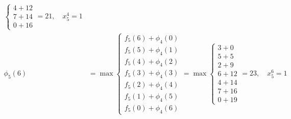 \documentclass{article}
\begin{document}
\[\begin{aligned}
\begin{cases}
                                                  4 + 12 \\
                                                  7 + 14 \\
                                                  0 + 16
                                              \end{cases} = 21, \quad x_5^4 = 1               \\
        \phi_5(6) & = \max \begin{cases}
                               f_5(6) + \phi_4(0) \\
                               f_5(5) + \phi_4(1) \\
                               f_5(4) + \phi_4(2) \\
                               f_5(3) + \phi_4(3) \\
                               f_5(2) + \phi_4(4) \\
                               f_5(1) + \phi_4(5) \\
                               f_5(0) + \phi_4(6)
                           \end{cases} = \max \begin{cases}
                                                  3 + 0  \\
                                                  5 + 5  \\
                                                  2 + 9  \\
                                                  6 + 12 \\
                                                  4 + 14 \\
                                                  7 + 16 \\
                                                  0 + 19
                                              \end{cases} = 23, \quad x_5^6 = 1               \\
    \end{aligned}
\]
\end{document}
